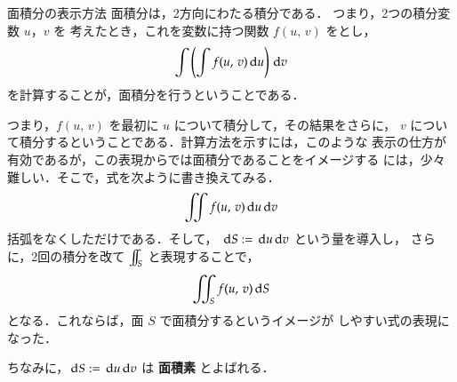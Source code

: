     \begin{memo}{面積分の表示方法}
        面積分は，2方向にわたる積分である．
        つまり，2つの積分変数 $u$，$v$ を
        考えたとき，これを変数に持つ関数 $f(u,\,v)$ をとし，
            \begin{align*}
                \int \left( \int f(u,\,v) \,\mathrm{d} u \right) \,\mathrm{d} v
            \end{align*}
        を計算することが，面積分を行うということである．

        つまり，$f(u,\,v)$ を最初に $u$ について積分して，その結果をさらに，
        $v$ について積分するということである．計算方法を示すには，このような
        表示の仕方が有効であるが，この表現からでは面積分であることをイメージする
        には，少々難しい．そこで，式を次ように書き換えてみる．
            \begin{align*}
                 \int\mspace{-11mu}\int f(u,\,v) \,\mathrm{d} u \,\mathrm{d} v
            \end{align*}
        括弧をなくしただけである．そして，
        $\,\mathrm{d} S := \,\mathrm{d} u\,\mathrm{d} v$ という量を導入し，
        さらに，2回の積分を改て $\int\mspace{-11mu}\int_{S}$ と表現することで，
            \begin{align*}
                \int\mspace{-11mu}\int_{S} f(u,\,v) \,\mathrm{d} S
            \end{align*}
        となる．これならば，面 $S$ で面積分するというイメージが
        しやすい式の表現になった．

        ちなみに，$\,\mathrm{d} S := \,\mathrm{d} u\,\mathrm{d} v$ は \textbf{面積素} とよばれる．
    \end{memo}

